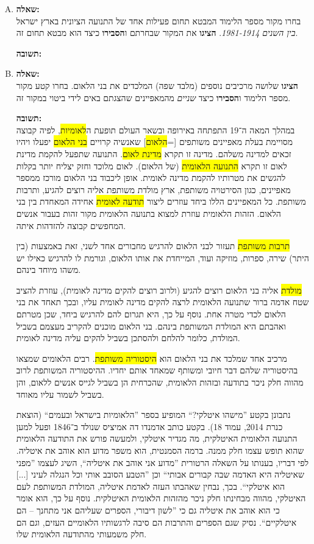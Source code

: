 \documentclass[a4paper]{article}
\newcommand\hl[1]   {\colorbox{yellow}{\!\!#1\!\!}}
\begin{document}
\begin{enumerate}[A.]
			\item \textbf{שאלה: }\\
			בחרו מקור מספר הלימוד המבטא תחום פעילות אחד של התנועה הציונית בארץ ישראל \textit{בין השנים 1981-1914}. \textbf{הציגו} את המקור שבחרתם ו\textbf{הסבירו} כיצד הוא מבטא תחום זה. 
			
			\textbf{תשובה: }\\ 
			
			\item \textbf{שאלה: }\\
			\textbf{הציגו} שלושה מרכיבים נוספים (מלבד שפה) המלכדים את בני הלאום. בחרו קטע מקור מספר הלימוד ו\textbf{הסבירו} כיצד \textit{שניים} מהמאפיינים שהצגתם באים לידי ביטוי במקור זה. 
			
			\textbf{תשובה: }\\
			במהלך המאה ה־19 התפתחה באירופה ובשאר העולם תופעת ה\hl{לאומיות}, לפיה קבוצה מסויימת בעלת מאפיינים משותפים [=\hl{הלאום}] שאנשיה קרויים \hl{בני הלאום} יפעלו ויהיו זכאים למדינה משלהם. מדינה זו תקרא \hl{מדינת לאום}. התנועה שתפעל להקמת מדינת לאום זו תקרא \hl{התנועה הלאומית} (של הלאום). לאום מלוכד וחזק יצליח יותר בקלות להגשים את מטרותיו להקמת מדינה לאומית. אופן ליכבוד בני הלאום מורכז ממספר מאפיינים, כגון הסירטויה משותפת, ארץ מולדת משותפת אליה רוצים להגיע, ותרבות משותפת. כל המאפיינים הללו ביחד עוזרים ליצור \hl{תודעה לאומית} אחידה המאחדת בין בני הלאום. הזהות הלאומית עוזרת למצוא בתנועה הלאומית מקור זהות בעבור אנשים המחפשים קבוצה להזדהות איתה. 
			
			\hl{תרבות משותפת} תעזור לבני הלאום להרגיש מחבורים אחד לשני, זאת באמצעות (בין היתר) שירה, ספרות, מוזיקה ועוד, המייחדת את אותו הלאום, וגורמת לו להרגיש כאילו יש משהו מיוחד בינהם. 
			
			\hl{מולדת} אליה בני הלאום רוצים להגיע (ולרוב רוצים להקים מדינה לאומית), עוזרת להציב שטח אדמה ברור שתנועה הלאומית לרצה להקים מדינה לאומית עליו, ובכך תאחד את בני הלאום לכדי מטרה אחת. נוסף על כך, היא תגרום להם להרגיש ביחד, שכן מטרתם ואהבתם היא המולדת המשותפת בינהם. בני הלאום מוכנים להקריב מעצמם בשביל המולדת, כלומר להלחם ולהסתכן בשביל להקים עליה מדינה לאומית. 
			
			מרכיב אחד שמלכד את בני הלאום הוא \hl{היסטוריה משותפת}. רבים הלאומים שמצאו בהיסטוריה שלהם דבר חיובי ומשותף שמאחד אותם יחדיו. ההיסטוריה המשותפת לרוב מהווה חלק ניכר בתודעה ובזהות הלאומית, שהכרחית הן בשביל לגייס אנשים ללאום, והן בשביל לשמור עליו מאוחד. 
			
			נתבונן בקטע ''מישהו איטלקי?`` המופיע בספר ''הלאומיות בישראל ובעמים`` (הוצאת כנרת 2014, עמוד 18). בקטע כותב אדמנדו דה אמיציס שנולד ב־1846 ופעל למען התנועה הלאומית האיטלקית, מה מגדיר איטלקי, ולמעשה פורש את התודעה הלאומית שהוא תופש עצמו חלק ממנה. ברמה הסמנטית, הוא משפר מדוע הוא אוהב את איטליה. לפי דבריו, בענותו על השאלה הרטורית ''מדוע אני אוהב את איטליה``, השיג לעצמו ''מפני שאיטליה היא האדמה שבה קבורים אבותי`` וכן ''הטבע הסובב אותי וכל הנגלה לעיני [...] הוא איטלקי``. בכך, נבחין שאהבתו העזה לאדמת איטליה, המולדת המשותפת לעם האיטלקי, מהווה מבחינתו חלק ניכר מהזהות הלאומית האיטלקית. נוסף על כך, הוא אומר כי הוא אוהב את איטליה גם כי ''לשון דיבורי, הספרים שעליהם אני מתחנך – הם איטלקיים``. נסיק שגם הספרים והתרבות הם סיבה לרגשותיו הלאומיים העזים, וגם הם חלק משמעותי מהתודעה הלאומית שלו. 
			

\end{enumerate}
\end{document}
